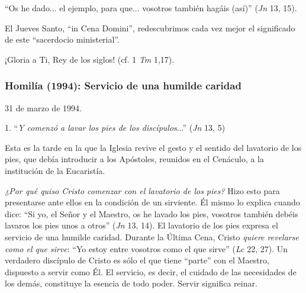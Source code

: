 			\begin{body}“Os he dado... el ejemplo, para que... vosotros también hagáis (así)” (\textit{Jn }13, 15). \end{body}
			
			\begin{body}El Jueves Santo, “in Cena Domini”, redescubrimos cada vez mejor el significado de este “sacerdocio ministerial”. \end{body}
			
			\begin{body}¡Gloria a Ti, Rey de los siglos! (cf. 1 \textit{Tm }1,17).\end{body}
			
			\subsubsection{Homilía (1994): Servicio de una humilde caridad}
			
			\begin{referencia}31 de marzo de 1994.\end{referencia}
			
			\begin{body} 1. “\textit{Y comenzó a lavar los pies de los discípulos}...” (\textit{Jn} 13, 5) \end{body}
			
			\begin{body}Esta es la tarde en la que la Iglesia revive el gesto y el sentido del lavatorio de los pies, que debía introducir a los Apóstoles, reunidos en el Cenáculo, a la institución de la Eucaristía. \end{body}
			
			\begin{body}\textit{¿Por qué quiso Cristo comenzar con el lavatorio de los pies?} Hizo esto para presentarse ante ellos en la condición de un sirviente. Él mismo lo explica cuando dice: “Si yo, el Señor y el Maestro, os he lavado los pies, vosotros también debéis lavaros los pies unos a otros” (\textit{Jn }13, 14). El lavatorio de los pies expresa el servicio de una humilde caridad. Durante la Última Cena, Cristo \textit{quiere revelarse como el que sirve}: “Yo estoy entre vosotros como el que sirve” (\textit{Lc} 22, 27). Un verdadero discípulo de Cristo es sólo el que tiene “parte” con el Maestro, dispuesto a servir como Él. El servicio, es decir, el cuidado de las necesidades de los demás, constituye la esencia de todo poder. Servir significa reinar. \end{body}
			
